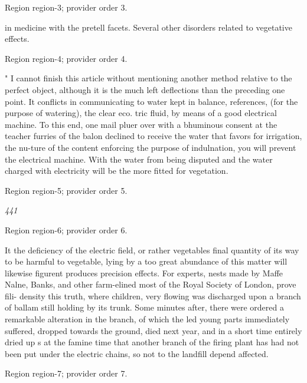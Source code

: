 \documentclass[11pt]{article}
\begin{document}
{\scriptsize\color{gray} Region region-3; provider order 3.\par}
\medskip

in medicine with the pretell facets. Several other disorders related to vegetative
effects.
\par

{\scriptsize\color{gray} Region region-4; provider order 4.\par}
\medskip

" I cannot finish this article without mentioning another method relative to the perfect object, although it is the much left deflections than the preceding one point. It conflicts in communicating to water kept in balance, references, (for the purpose of watering), the clear eco. tric fluid, by means of a good electrical machine. To this end, one mail pluer over with a bhuminous consent at the teacher furries of the balon declined to receive the water that favors for irrigation, the nu-ture of the content enforcing the purpose of indulnation, you will prevent the electrical machine. With the water from being disputed and the water charged with electricity will be the more fitted for vegetation.
\par

{\scriptsize\color{gray} Region region-5; provider order 5.\par}
\medskip

{\small\itshape 441\par}

{\scriptsize\color{gray} Region region-6; provider order 6.\par}
\medskip

It the deficiency of the electric field, or rather vegetables final quantity of its way to be harmful to vegetable, lying by a too great abundance of this matter will likewise figurent produces precision effects. For experts, nests made by Maffe Nalne, Banks, and other farm-elined most of the Royal Society of London, prove fili- density this truth, where children, very flowing was discharged upon a branch of ballam still holding by its trunk. Some minutes after, there were ordered a remarkable alteration in the branch, of which the led young parts immediately suffered, dropped towards the ground, died next year, and in a short time entirely dried up s at the famine time that another branch of the firing plant has had not been put under the electric chains, so not to the landfill depend affected.
\par

{\scriptsize\color{gray} Region region-7; provider order 7.\par}
\medskip
\end{document}
